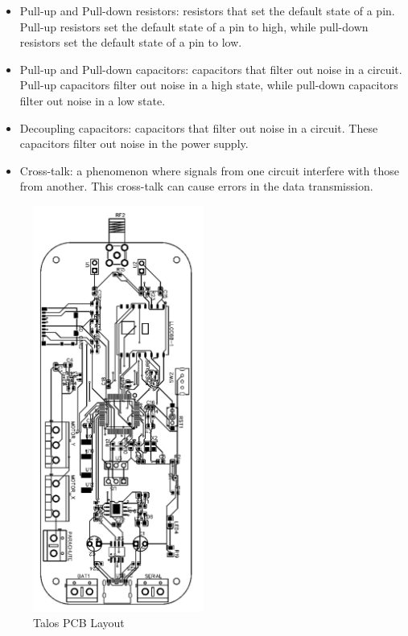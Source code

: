 \documentclass{article}
\begin{document}
\begin{itemize}
      \item Pull-up and Pull-down resistors: resistors that set the default state of a pin. Pull-up resistors set the default state of a pin to high, while pull-down resistors set the default state of a pin to low.
      \item Pull-up and Pull-down capacitors: capacitors that filter out noise in a circuit. Pull-up capacitors filter out noise in a high state, while pull-down capacitors filter out noise in a low state.
      \item Decoupling capacitors: capacitors that filter out noise in a circuit. These capacitors filter out noise in the power supply.
      \item Cross-talk: a phenomenon where signals from one circuit interfere with those from another. This cross-talk can cause errors in the data transmission.
\end{itemize}
\begin{figure}[h!]
      \caption{Talos PCB Layout}
      \label{fig:talos_pcb_layout}
      \centering
      \includegraphics[width=0.5\textwidth]{PCB.png}
\end{figure}
\end{document}
